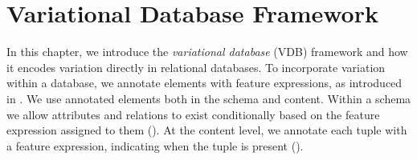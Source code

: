 \chapter{Variational Database Framework}
\label{ch:vdb}

In this chapter, we introduce the \emph{variational database} (VDB) framework and how it encodes
variation directly in relational databases.
To incorporate variation within a database, we annotate elements with feature expressions,
as introduced in . We use annotated elements both in the schema and content.
Within a schema we allow attributes and relations to exist 
conditionally based on the feature expression assigned to them ().
At the content level, we annotate each tuple with a feature expression, indicating when the tuple 
is present (). 



%



%
